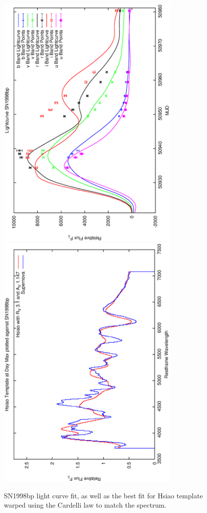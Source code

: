 \clearpage

\begin{figure}[p]
\centering
\includegraphics[angle=-90,width=0.8\textwidth]{./figures/ltcv/SN1998bp_v027_lightcurve.ps}
\hfill
\includegraphics[angle=-90,width=0.8\textwidth]{./figures/hsiao/SN1998bp_v001_hsiao.ps}
\hfill
\caption{SN1998bp light curve fit, as well as the best fit for Hsiao template warped using the Cardelli law to match the spectrum.}
\label{fig:SN1998bpfour2}
\end{figure}

